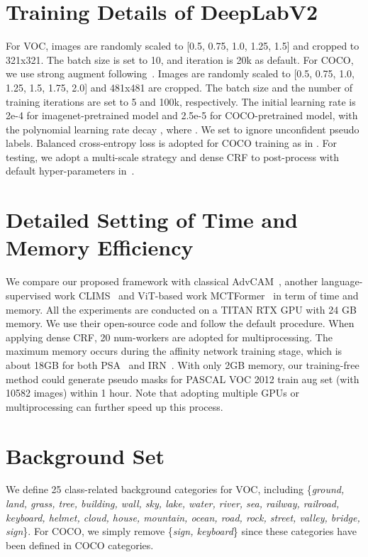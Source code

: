 \documentclass[10pt,twocolumn,letterpaper]{article}
\begin{document}
\section{Training Details of DeepLabV2}
For VOC, images are randomly scaled to [0.5, 0.75, 1.0, 1.25, 1.5] and cropped to 321x321. The batch size is set to 10, and iteration is 20k as default. For COCO, we use strong augment following~\cite{Lee2022AMN}. Images are randomly scaled to [0.5, 0.75, 1.0, 1.25, 1.5, 1.75, 2.0] and 481x481 are cropped. The batch size and the number of training iterations are set to 5 and 100k, respectively. The initial learning rate is 2e-4 for imagenet-pretrained model and 2.5e-5 for COCO-pretrained model, with the polynomial learning rate decay , where . We set  to ignore unconfident pseudo labels. Balanced cross-entropy loss is adopted for COCO training as in \cite{Lee2021advcam,Lee2022AMN}. For testing, we adopt a multi-scale strategy and dense CRF to post-process with default hyper-parameters in~\cite{chen2017deeplab}.

\section{Detailed Setting of Time and Memory Efficiency}
We compare our proposed framework with classical AdvCAM~\cite{Lee2021advcam}, another language-supervised work CLIMS~\cite{Xie_2022_CLIMS} and ViT-based work MCTFormer~\cite{xu2022mctformer} in term of time and memory. All the experiments are conducted on a TITAN RTX GPU with 24 GB memory. We use their open-source code and follow the default procedure. When applying dense CRF, 20 num-workers are adopted for multiprocessing. The maximum memory occurs during the affinity network training stage, which is about 18GB for both
PSA~\cite{Ahn2018PSA} and IRN~\cite{Ahn2019IRN}. With only 2GB memory, our training-free method could generate pseudo masks for PASCAL VOC 2012 train aug set (with 10582 images) within 1 hour. Note that adopting multiple GPUs or multiprocessing can further speed up this process.

\section{Background Set}
We define 25 class-related background categories for VOC, including \{\textit{ground, land, grass, tree, building, wall, sky, lake, water, river, sea, railway, railroad, keyboard, helmet, cloud, house, mountain, ocean, road, rock, street, valley, bridge, sign}\}. For COCO, we simply remove \{\textit{sign, keyboard}\} since these categories have been defined in COCO categories.
\end{document}
